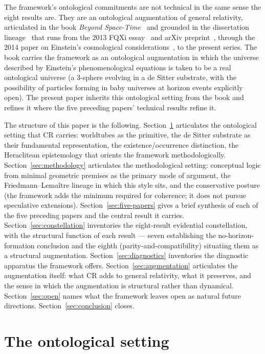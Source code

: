 \documentclass[11pt,a4paper]{article}
\theoremstyle{definition}
\begin{document}
The framework's ontological commitments are not technical in the same sense the eight results are. They are an ontological augmentation of general relativity, articulated in the book \emph{Beyond Space-Time}~\cite{Janzen2025} and grounded in the dissertation lineage~\cite{Janzen2012} that runs from the 2013 FQXi essay~\cite{Janzen2013a} and arXiv preprint~\cite{Janzen2013b}, through the 2014 paper on Einstein's cosmological considerations~\cite{Janzen2014}, to the present series. The book carries the framework as an ontological augmentation in which the universe described by Einstein's phenomenological equations is taken to be a real ontological universe (a 3-sphere evolving in a de Sitter substrate, with the possibility of particles forming in baby universes at horizon events explicitly open). The present paper inherits this ontological setting from the book and refines it where the five preceding papers' technical results refine it.

The structure of this paper is the following. Section~\ref{sec:ontology} articulates the ontological setting that CR carries: worldtubes as the primitive, the de Sitter substrate as their fundamental representation, the existence/occurrence distinction, the Heraclitean epistemology that orients the framework methodologically. Section~\ref{sec:methodology} articulates the methodological setting: conceptual logic from minimal geometric premises as the primary mode of argument, the Friedmann--Lema\^itre lineage in which this style sits, and the conservative posture (the framework adds the minimum required for coherence; it does not pursue speculative extensions). Section~\ref{sec:five-papers} gives a brief synthesis of each of the five preceding papers and the central result it carries. Section~\ref{sec:constellation} inventories the eight-result evidential constellation, with the structural function of each result --- seven establishing the no-horizon-formation conclusion and the eighth (parity-and-compatibility) situating them as a structural augmentation. Section~\ref{sec:diagnostics} inventories the diagnostic apparatus the framework offers. Section~\ref{sec:augmentation} articulates the augmentation itself: what CR adds to general relativity, what it preserves, and the sense in which the augmentation is structural rather than dynamical. Section~\ref{sec:open} names what the framework leaves open as natural future directions. Section~\ref{sec:conclusion} closes.

\section{The ontological setting}\label{sec:ontology}
\end{document}
